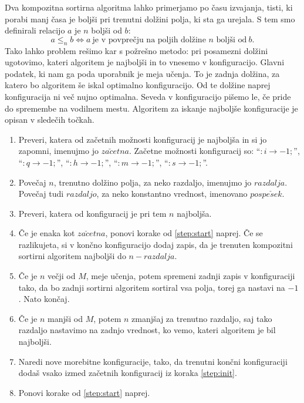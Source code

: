 \documentclass[a4paper,oneside]{article}
\newcommand{\lra}{\ensuremath{\longrightarrow}}
\begin{document}
Dva kompozitna sortirna algoritma lahko primerjamo po času izvajanja, tisti, ki porabi manj
časa je boljši pri trenutni dolžini polja, ki sta ga urejala.
S tem smo definirali relacijo $a$ je $n$ boljši od $b$:
\[ a \leq_n b \Leftrightarrow a\ \text{je v povprečju na poljih dolžine $n$ boljši
od}\ b.\]
Tako lahko problem rešimo kar s požrešno metodo: 
pri posamezni dolžini ugotovimo, kateri algoritem je najboljši in to vnesemo
v konfiguracijo. Glavni podatek, ki nam ga poda uporabnik je meja učenja. To je zadnja
dolžina, za katero bo algoritem še iskal optimalno konfiguracijo. Od te dolžine naprej
konfiguracija ni več nujno optimalna. Seveda v konfiguracijo pišemo le, če pride do 
spremembe na vodilnem mestu. Algoritem za iskanje najboljše konfiguracije je opisan v
sledečih točkah.
\begin{enumerate}
  \item \label{step:init}Preveri, katera od začetnih možnosti konfiguracij je najboljša in
    si jo zapomni, imenujmo jo $za\check{c}etna$. Začetne možnosti konfiguracij so:
    ``$:i \lra -1;$'', ``$:q \lra -1;$'', ``$:h \lra -1;$'',
    ``$:m \lra -1;$'', ``$:s \lra -1;$''.
  \item \label{step:start}Povečaj $n$, trenutno dolžino polja, za neko razdaljo, imenujmo
    jo $razdalja$. Povečaj tudi $razdaljo$, za neko konstantno vrednost, imenovano
    $pospe\check{s}ek$.
  \item Preveri, katera od konfiguracij je pri tem $n$ najboljša.
  \item \label{step:check}Če je enaka kot $za\check{c}etna$, ponovi korake od \ref{step:start} 
    naprej. Če se razlikujeta, si v končno konfiguracijo dodaj zapis, da je
    trenuten kompozitni sortirni algoritem najboljši do $n - razdalja$.
  \item Če je $n$ večji od $M$, meje učenja, potem spremeni zadnji zapis v konfiguraciji
    tako, da bo zadnji sortirni algoritem sortiral vsa polja, torej ga nastavi na $-1$.
    Nato končaj.
  \item Če je $n$ manjši od $M$, potem $n$ zmanjšaj za trenutno razdaljo, saj
    tako razdaljo nastavimo na zadnjo vrednost, ko vemo, kateri algoritem je bil
    najboljši.
  \item Naredi nove morebitne konfiguracije, tako, da trenutni končni konfiguraciji dodaš
    vsako izmed začetnih konfiguracij iz koraka \ref{step:init}.
  \item Ponovi korake od \ref{step:start} naprej.
\end{enumerate}
\end{document}
